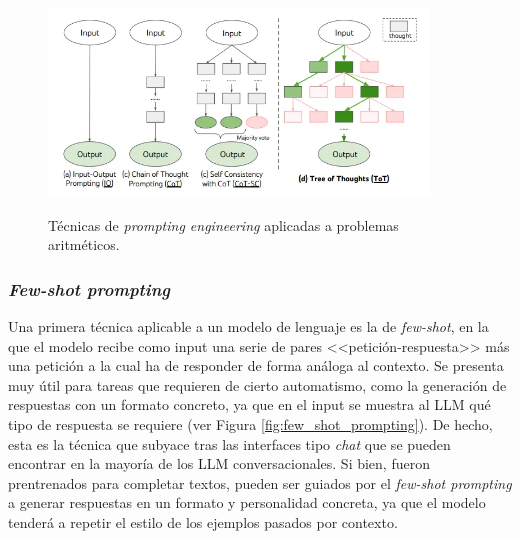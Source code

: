 \begin{figure}[H]
    \caption[Técnicas de \textit{prompting engineering}]{Técnicas de \textit{prompting engineering} aplicadas a problemas aritméticos.}
    \centering
    \includegraphics[width=0.9\textwidth]{./figuras/prompt_engineering_techniques.png}
    \label{fig:prompting_engineering}
\end{figure}

\subsubsection{\textit{Few-shot prompting}}

Una primera técnica aplicable a un modelo de lenguaje es la de \textit{few-shot}, en la que el modelo recibe como input una serie de pares <<petición-respuesta>> más una petición a la cual ha de responder de forma análoga al contexto. Se presenta muy útil para tareas que requieren de cierto automatismo, como la generación de respuestas con un formato concreto, ya que en el input se muestra al LLM qué tipo de respuesta se requiere (ver Figura \ref{fig:few_shot_prompting}). De hecho, esta es la técnica que subyace tras las interfaces tipo \textit{chat} que se pueden encontrar en la mayoría de los LLM conversacionales. Si bien, fueron prentrenados para completar textos, pueden ser guiados por el \textit{few-shot prompting} a generar respuestas en un formato y personalidad concreta, ya que el modelo tenderá a repetir el estilo de los ejemplos pasados por contexto.




